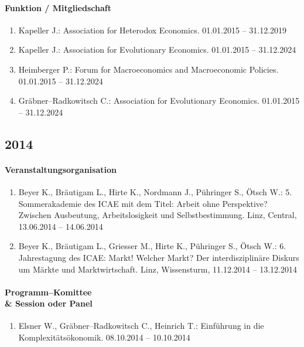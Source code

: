 \paragraph{Funktion / Mitgliedschaft}
\begin{enumerate}[leftmargin=*, labelsep=0.5cm]
\item Kapeller J.: Association for Heterodox Economics. 01.01.2015 -- 31.12.2019
\item Kapeller J.: Association for Evolutionary Economics. 01.01.2015 -- 31.12.2024
\item Heimberger P.: Forum for Macroeconomics and Macroeconomic Policies. 01.01.2015 -- 31.12.2024
\item Gräbner--Radkowitsch C.: Association for Evolutionary Economics. 01.01.2015 -- 31.12.2024
\end{enumerate}
\subsection*{2014}
\paragraph{Veranstaltungsorganisation}
\begin{enumerate}[leftmargin=*, labelsep=0.5cm]
\item Beyer K., Bräutigam L., Hirte K., Nordmann J., Pühringer S., Ötsch W.: 5. Sommerakademie des ICAE mit dem Titel: Arbeit ohne Perspektive? Zwischen Ausbeutung, Arbeitslosigkeit und Selbstbestimmung. Linz, Central, 13.06.2014 -- 14.06.2014
\item Beyer K., Bräutigam L., Griesser M., Hirte K., Pühringer S., Ötsch W.: 6. Jahrestagung des ICAE: Markt! Welcher Markt? Der interdisziplinäre Diskurs um Märkte und Marktwirtschaft. Linz, Wissensturm, 11.12.2014 -- 13.12.2014
\end{enumerate}

\paragraph{Programm--Komittee \\\& Session oder Panel}
\begin{enumerate}[leftmargin=*, labelsep=0.5cm]
\item Elsner W., Gräbner--Radkowitsch C., Heinrich T.: Einführung in die Komplexitätsökonomik. 08.10.2014 -- 10.10.2014
\end{enumerate}

